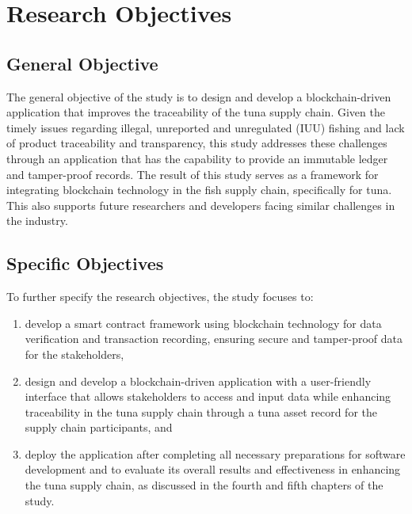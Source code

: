 \section{Research Objectives}
\label{sec:researchobjectives}

\subsection{General Objective}
\label{sec:generalobjective}

The general objective of the study is to design and develop a blockchain-driven application that improves the traceability of the tuna supply chain. Given the timely issues regarding illegal, unreported and unregulated (IUU) fishing and lack of product traceability and transparency, this study addresses these challenges through an application that has the capability to provide an immutable ledger and tamper-proof records. The result of this study serves as a framework for integrating blockchain technology in the fish supply chain, specifically for tuna. This also supports future researchers and developers facing similar challenges in the industry.


\subsection{Specific Objectives}
\label{sec:specificobjectives}

To further specify the research objectives, the study focuses to:

\begin{enumerate}
	
	\item develop a smart contract framework using blockchain technology for data verification and transaction recording, ensuring secure and tamper-proof data for the stakeholders,
	\item design and develop a blockchain-driven application with a user-friendly interface that allows stakeholders to access and input data while enhancing traceability in the tuna supply chain through a tuna asset record for the supply chain participants, and 
	\item deploy the application after completing all necessary preparations for software development and to evaluate its overall results and effectiveness in enhancing the tuna supply chain, as discussed in the fourth and fifth chapters of the study.
\end{enumerate}


